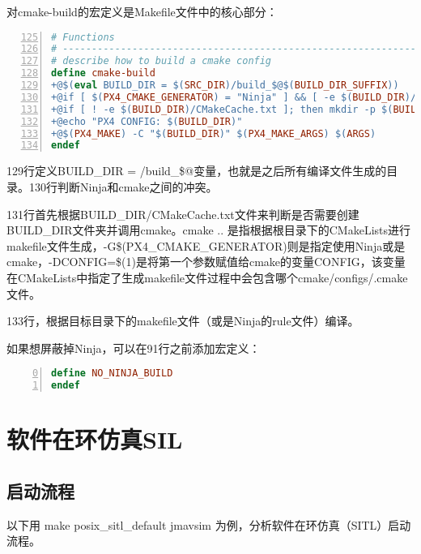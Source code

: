 对cmake-build的宏定义是Makefile文件中的核心部分：
\begin{lstlisting}[language=make,numbers=left,firstnumber = 125,numberstyle=\tiny,breaklines = true, keywordstyle=\color{blue!70},commentstyle=\color{red!50!green!50!blue!50},frame=shadowbox, rulesepcolor=\color{red!20!green!20!blue!20}]
# Functions
# --------------------------------------------------------------------
# describe how to build a cmake config
define cmake-build
+@$(eval BUILD_DIR = $(SRC_DIR)/build_$@$(BUILD_DIR_SUFFIX))
+@if [ $(PX4_CMAKE_GENERATOR) = "Ninja" ] && [ -e $(BUILD_DIR)/Makefile ]; then rm -rf $(BUILD_DIR); fi
+@if [ ! -e $(BUILD_DIR)/CMakeCache.txt ]; then mkdir -p $(BUILD_DIR) && cd $(BUILD_DIR) && cmake .. -G$(PX4_CMAKE_GENERATOR) -DCONFIG=$(1) $(CMAKE_ARGS) || (cd .. && rm -rf $(BUILD_DIR)); fi
+@echo "PX4 CONFIG: $(BUILD_DIR)"
+@$(PX4_MAKE) -C "$(BUILD_DIR)" $(PX4_MAKE_ARGS) $(ARGS)
endef
\end{lstlisting}

129行定义BUILD_DIR = /build_\$@变量，也就是之后所有编译文件生成的目录。130行判断Ninja和cmake之间的冲突。

131行首先根据BUILD_DIR/CMakeCache.txt文件来判断是否需要创建BUILD_DIR文件夹并调用cmake。cmake .. 是指根据根目录下的CMakeLists进行makefile文件生成，-G\$(PX4_CMAKE_GENERATOR)则是指定使用Ninja或是cmake，-DCONFIG=\$(1)是将第一个参数赋值给cmake的变量CONFIG，该变量在CMakeLists中指定了生成makefile文件过程中会包含哪个cmake/configs/.cmake文件。

133行，根据目标目录下的makefile文件（或是Ninja的rule文件）编译。

如果想屏蔽掉Ninja，可以在91行之前添加宏定义：
\begin{lstlisting}[language=make,numbers=left,firstnumber = 0,breaklines = true,numberstyle=\tiny,keywordstyle=\color{blue!70},commentstyle=\color{red!50!green!50!blue!50},frame=shadowbox, rulesepcolor=\color{red!20!green!20!blue!20}]
define NO_NINJA_BUILD
endef
\end{lstlisting}



\section{软件在环仿真SIL}
\subsection{启动流程}
以下用 make posix_sitl_default jmavsim 为例，分析软件在环仿真（SITL）启动流程。

